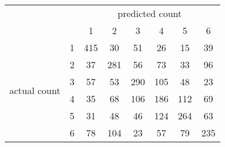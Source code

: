
\begin{tabular}{*{8}{c}}
& & \multicolumn{6}{c}{predicted count} \\
& & 1 & 2 & 3 & 4 & 5 & 6 \\
\multirow{6}{*}{actual count}
& 1 & 415 & 30 & 51 & 26 & 15 & 39 \\
& 2 & 37 & 281 & 56 & 73 & 33 & 96 \\
& 3 & 57 & 53 & 290 & 105 & 48 & 23 \\
& 4 & 35 & 68 & 106 & 186 & 112 & 69 \\
& 5 & 31 & 48 & 46 & 124 & 264 & 63 \\
& 6 & 78 & 104 & 23 & 57 & 79 & 235 \\
\end{tabular}
